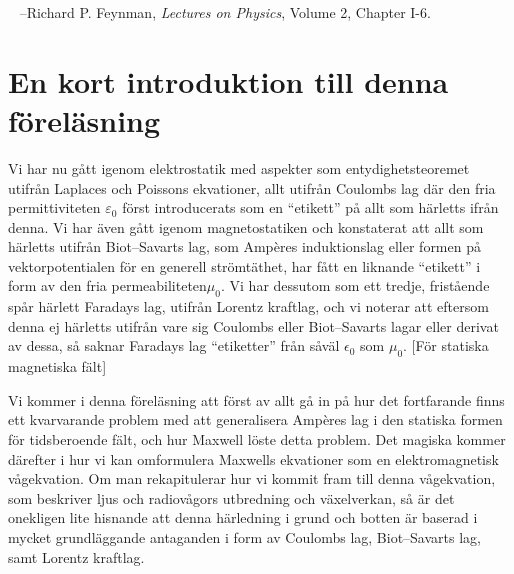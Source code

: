 ~\bigskip
{}
\hskip80pt --Richard P. Feynman, {\it Lectures on Physics}, Volume 2, Chapter I-6.
\bigskip

\section{En kort introduktion till denna f{\"o}rel{\"a}sning}
Vi har nu g{\aa}tt igenom elektrostatik med aspekter som entydighetsteoremet
utifr{\aa}n Laplaces och Poissons ekvationer, allt utifr{\aa}n Coulombs lag
d{\"a}r den fria permittiviteten $\varepsilon_0$ f{\"o}rst introducerats som
en ``etikett'' p{\aa} allt som h{\"a}rletts ifr{\aa}n denna.
Vi har {\"a}ven g{\aa}tt igenom magnetostatiken och konstaterat att allt som
h{\"a}rletts utifr{\aa}n Biot--Savarts lag, som Amp{\`e}res induktionslag eller
formen p{\aa} vektorpotentialen f{\"o}r en generell str{\"o}mt{\"a}thet, har
f{\aa}tt en liknande ``etikett'' i form av den fria permeabiliteten$\mu_0$.
Vi har dessutom som ett tredje, frist{\aa}ende sp{\aa}r h{\"a}rlett Faradays
lag, utifr{\aa}n Lorentz kraftlag, och vi noterar att eftersom denna ej
h{\"a}rletts utifr{\aa}n vare sig Coulombs eller Biot--Savarts lagar eller
derivat av dessa, s{\aa} saknar Faradays lag ``etiketter'' fr{\aa}n
s{\aa}v{\"a}l $\epsilon_0$ som $\mu_0$.
[F{\"o}r statiska magnetiska f{\"a}lt]

Vi kommer i denna f{\"o}rel{\"a}sning att f{\"o}rst av allt g{\aa} in p{\aa}
hur det fortfarande finns ett kvarvarande problem med att generalisera
Amp{\`e}res lag i den statiska formen f{\"o}r tidsberoende f{\"a}lt, och hur
Maxwell  l{\"o}ste detta problem.
Det magiska kommer d{\"a}refter i hur vi kan omformulera Maxwells ekvationer
 som en elektromagnetisk v{\aa}gekvation.
Om man rekapitulerar hur vi kommit fram till denna v{\aa}gekvation, som
beskriver ljus och radiov{\aa}gors utbredning och v{\"a}xelverkan, s{\aa}
{\"a}r det onekligen lite hisnande att denna h{\"a}rledning i grund och botten
{\"a}r baserad i mycket grundl{\"a}ggande antaganden i form av Coulombs lag,
Biot--Savarts lag, samt Lorentz kraftlag.
\vfill\eject

